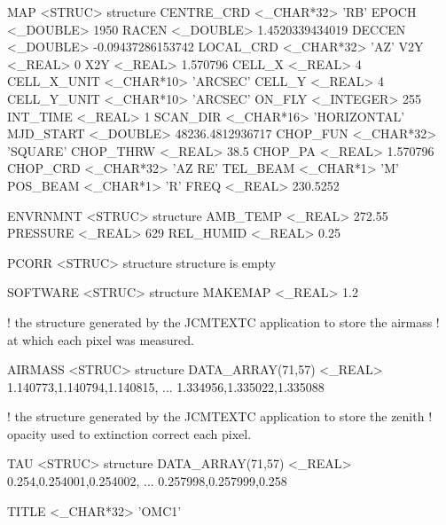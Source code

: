 \documentclass[twoside,11pt,nolof]{starlink}
\begin{document}
\begin{small}
\begin{terminalv}
         MAP            <STRUC>         {structure}
            CENTRE_CRD     <_CHAR*32>      'RB'
            EPOCH          <_DOUBLE>       1950
            RACEN          <_DOUBLE>       1.4520339434019
            DECCEN         <_DOUBLE>       -0.09437286153742
            LOCAL_CRD      <_CHAR*32>      'AZ'
            V2Y            <_REAL>         0
            X2Y            <_REAL>         1.570796
            CELL_X         <_REAL>         4
            CELL_X_UNIT    <_CHAR*10>      'ARCSEC'
            CELL_Y         <_REAL>         4
            CELL_Y_UNIT    <_CHAR*10>      'ARCSEC'
            ON_FLY         <_INTEGER>      255
            INT_TIME       <_REAL>         1
            SCAN_DIR       <_CHAR*16>      'HORIZONTAL'
            MJD_START      <_DOUBLE>       48236.4812936717
            CHOP_FUN       <_CHAR*32>      'SQUARE'
            CHOP_THRW      <_REAL>         38.5
            CHOP_PA        <_REAL>         1.570796
            CHOP_CRD       <_CHAR*32>      'AZ  RE'
            TEL_BEAM       <_CHAR*1>       'M'
            POS_BEAM       <_CHAR*1>       'R'
            FREQ           <_REAL>         230.5252

         ENVRNMNT       <STRUC>         {structure}
            AMB_TEMP       <_REAL>         272.55
            PRESSURE       <_REAL>         629
            REL_HUMID      <_REAL>         0.25

         PCORR          <STRUC>         {structure}
            {structure is empty}

         SOFTWARE       <STRUC>         {structure}
            MAKEMAP        <_REAL>         1.2

! the structure generated by the JCMTEXTC application to store the airmass
! at which each pixel was measured.

         AIRMASS        <STRUC>         {structure}
            DATA_ARRAY(71,57)  <_REAL>     1.140773,1.140794,1.140815,
                                           ... 1.334956,1.335022,1.335088

! the structure generated by the JCMTEXTC application to store the zenith
! opacity used to extinction correct each pixel.

         TAU            <STRUC>         {structure}
            DATA_ARRAY(71,57)  <_REAL>     0.254,0.254001,0.254002,
                                           ... 0.257998,0.257999,0.258


   TITLE          <_CHAR*32>      'OMC1'
\end{terminalv}
\end{small}
\end{document}

